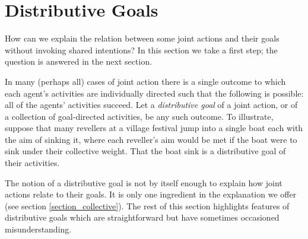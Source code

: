 \documentclass[12pt,a4paper]{extarticle}
\begin{document}




\section{Distributive Goals}
\label{section_distributive}

How can we explain the relation between some joint actions and  their goals without invoking shared intentions?  In this section we take a first step; the question is answered in the next section.

In many (perhaps all) cases of joint action there is a single outcome to which each agent's activities are individually directed such that the following is possible: all of the agents' activities succeed.  
Let a \emph{distributive goal} of a joint action, or of a collection of goal-directed activities, be any such outcome.  
To illustrate, suppose that many revellers at a village festival jump into a single boat each with the aim of sinking it, where each reveller's aim would be met if the boat were to sink under their collective weight.  
That the boat sink is a distributive goal of their activities.

The notion of a distributive goal is not by itself enough to explain how joint actions relate to their goals.  
It is only one ingredient in the explanation we offer (see section \vref{section_collective}).  
The rest of this section highlights features of distributive goals which are  straightforward  but have sometimes occasioned misunderstanding.
\end{document}
